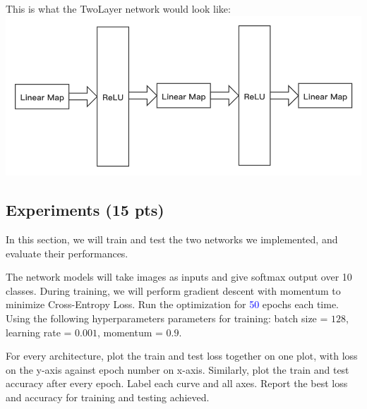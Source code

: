 This is what the TwoLayer network would look like:\\
\includegraphics[scale=0.5]{images/onetask.png}


\subsection{Experiments (15 pts)}
In this section, we will train and test the two networks we implemented, and evaluate their performances.  

The network models will take images as inputs and give softmax output over 10 classes. During training, we will perform gradient descent with momentum to minimize Cross-Entropy Loss. Run the optimization for \textcolor{blue}{50} epochs each time. Using the following hyperparameters parameters for training: batch size = $128$, learning rate = $0.001$, momentum = $0.9$. %

For every architecture, plot the train and test loss together on one plot, with loss on the y-axis against epoch number on x-axis. Similarly, plot the train and test accuracy after every epoch. Label each curve and all axes. Report the best loss and accuracy for training and testing achieved.

\pagebreak

